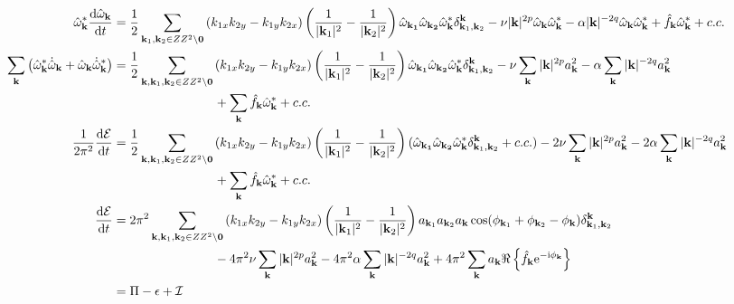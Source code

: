 \documentclass[9pt]{article}
\newcommand{\der}[2]{\frac{\mathrm{d}#1}{\mathrm{d}#2}}          	 %
\newcommand{\ii}{\mathrm{i}}      								  %
\newcommand{\e}{\mathrm{e}}      								  %
\newcommand{\omegahat}[1]{\hat{\omega}_{ \mathbf{#1} } }								%
\newcommand{\bfk}{\mathbf{k}}								%
\newcommand{\bfkn}[1]{\mathbf{k}_{#1}}								%
\begin{document}
\begin{align}
	\omegahat{k}^*\der{\omegahat{k}}{t} &= \frac{1}{2}	\sum_{\mathbf{k}_1, \mathbf{k}_2\in \mathbb{Z}^2\setminus \mathbf{0}}\left(k_{1x}k_{2y} - k_{1y}k_{2x}\right) \left(\frac{1}{|\bfkn{1}|^2} - \frac{1}{|\bfkn{2}|^2}\right) \omegahat{\bfkn{1}}\omegahat{\bfkn{2}}\omegahat{k}^* \delta_{\bfkn{1}, \bfkn{2}}^{\bfk} - \nu |\bfk|^{2p}\omegahat{k}\omegahat{k}^* - \alpha|\bfk|^{-2q}\omegahat{k}\omegahat{k}^* + \hat{f}_{\bfk} \omegahat{k}^* + c. c. \notag \\
	\sum_{\bfk}\left(\omegahat{k}^*\dot{\hat{\omega}}_\bfk + \omegahat{k}\dot{\hat{\omega}}^*_\bfk\right)&= \frac{1}{2}	\sum_{\bfk, \mathbf{k}_1, \mathbf{k}_2\in \mathbb{Z}^2\setminus \mathbf{0}}\left(k_{1x}k_{2y} - k_{1y}k_{2x}\right) \left(\frac{1}{|\bfkn{1}|^2} - \frac{1}{|\bfkn{2}|^2}\right) \omegahat{\bfkn{1}}\omegahat{\bfkn{2}}\omegahat{k}^* \delta_{\bfkn{1}, \bfkn{2}}^{\bfk} - \nu \sum_{\bfk}|\bfk|^{2p} a_{\bfk}^2 - \alpha\sum_{\bfk}|\bfk|^{-2q} a_{\bfk}^2 \notag\\ &\qquad \qquad \qquad \qquad+ \sum_{\bfk}\hat{f}_{\bfk} \omegahat{k}^* + c. c. \notag \\
	\frac{1}{2\pi^2}\der{\mathcal{E}}{t} &= \frac{1}{2}	\sum_{\bfk, \mathbf{k}_1, \mathbf{k}_2\in \mathbb{Z}^2\setminus \mathbf{0}}\left(k_{1x}k_{2y} - k_{1y}k_{2x}\right) \left(\frac{1}{|\bfkn{1}|^2} - \frac{1}{|\bfkn{2}|^2}\right) (\omegahat{\bfkn{1}}\omegahat{\bfkn{2}}\omegahat{k}^* \delta_{\bfkn{1}, \bfkn{2}}^{\bfk} + c.c.) - 2\nu \sum_{\bfk}|\bfk|^{2p} a_{\bfk}^2 - 2\alpha\sum_{\bfk} |\bfk|^{-2q}a_{\bfk}^2 \notag \\
	&\qquad \qquad \qquad \qquad+ \sum_{\bfk}\hat{f}_{\bfk} \omegahat{k}^* + c. c.\notag \\
	\der{\mathcal{E}}{t} &= 2\pi^2	\sum_{\bfk, \mathbf{k}_1, \mathbf{k}_2\in \mathbb{Z}^2\setminus \mathbf{0}}\left(k_{1x}k_{2y} - k_{1y}k_{2x}\right) \left(\frac{1}{|\bfkn{1}|^2} - \frac{1}{|\bfkn{2}|^2}\right) a_{\bfkn{1}} a_{\bfkn{2}} a_{\bfk} \cos(\phi_{\bfkn{1}} + \phi_{\bfkn{2}} - \phi_{\bfk}) \delta_{\bfkn{1}, \bfkn{2}}^{\bfk} \notag \\ & \qquad \qquad \qquad \qquad- 4\pi^2\nu \sum_{\bfk}|\bfk|^{2p} a_{\bfk}^2 - 4\pi^2\alpha\sum_{\bfk} |\bfk|^{-2q}a_{\bfk}^2 + 4\pi^2\sum_{\bfk}a_\bfk\Re\left\{\hat{f}_{\bfk} \e^{-\ii\phi_\bfk}\right\} \notag \\
	&= \Pi - \epsilon + \mathcal{I}
 \end{align}
\end{document}
